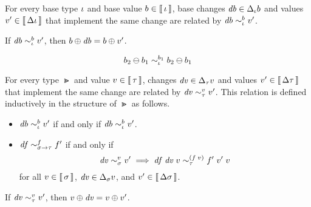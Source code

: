 \begin{oldSec}
\begin{parameter}
  \label{def:implements-base}
  For every base type $\iota$ and base value $b \in \Eval{\Gi}$,
  base changes $\D b \in \Change[\Gi]{b}$ and values $v' \in
  \Eval{\Change{\Gi}}$ that implement the same change are related
  by $\Implements[\Gi][b]{\D b}{v'}$.
\end{parameter}

\begin{parameter}
  \label{lem:carry-over-base}
  If $\Implements[\Gi][b]{\D b}{v'}$,
  then $\Apply{\D b}{b} = \Apply{v'}{b}$.
\end{parameter}

\begin{parameter}
  \label{lem:diff-implements-diff-base}
  \[\Implements[\Gi][b_1]{\Diff{b_2}{b_1}}{\Diff{b_2}{b_1}}\]
\end{parameter}

\begin{definition}
  \label{def:implements}
  For every type $\Gt$ and value $v \in \Eval{\Gt}$, changes $\D
  v \in \Change[\Gt]{v}$ and values $v' \in \Eval{\Change{\Gt}}$
  that implement the same change are related by
  $\Implements[\Gt][v]{\D v}{v'}$. This relation is defined
  inductively in the structure of $\Gt$ as follows.

  \begin{itemize}
  \item $\Implements[\Gi][b]{\D b}{v'}$ 
    if and only if
    $\Implements[\Gi][b]{\D b}{v'}$.
  \item $\Implements[\Fun{\Gs}{\Gt}][f]{\D f}{f'}$
    if and only if
    \[
      \Implements[\Gs][v]
        {\D v}
        {v'}
      \implies
      \Implements[\Gt][\App*{f}{v}] 
        {\App{\App{\D f}{\D v}}{v}}
        {\App{\App{f'}{v'}}{v}}
    \]
    for all
    $v \in \Eval{\Gs}$,
    $\D v \in \Change[\Gs]{v}$, and
    $v' \in \Eval{\Change{\Gs}}$.
  \end{itemize}
\end{definition}

\begin{lemma}
  \label{lem:carry-over}
  If $\Implements[\Gt][v]{\D v}{v'}$,
  then $\Apply{\D v}{v} = \Apply{v'}{v}$.
\end{lemma}
\end{oldSec}

